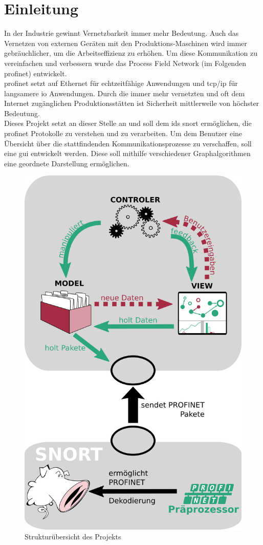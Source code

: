 \chapter*{Einleitung}

In der Industrie gewinnt Vernetzbarkeit immer mehr Bedeutung. Auch das Vernetzen von externen Geräten mit den Produktions-Maschinen wird immer gebräuchlicher, um die Arbeitseffizienz zu erhöhen. Um diese Kommunikation zu vereinfachen und verbessern wurde das Process Field Network (im Folgenden \gls{profinet}) entwickelt.\\
\gls{profinet} setzt auf Ethernet für echtzeitfähige Anwendungen und \gls{tcp}/\gls{ip} für langsamere \gls{io} Anwendungen. Durch die immer mehr vernetzten und oft dem Internet zugänglichen Produktionsstätten ist Sicherheit mittlerweile von höchster Bedeutung. \\
Dieses Projekt setzt an dieser Stelle an und soll dem \gls{ids} \gls{snort} ermöglichen, die \gls{profinet} Protokolle zu verstehen und zu verarbeiten. Um dem Benutzer eine Übersicht über die stattfindenden Kommunikationsprozesse zu verschaffen, soll eine \gls{gui} entwickelt werden. Diese soll mithilfe verschiedener Graphalgorithmen eine geordnete Darstellung ermöglichen.

\begin{figure}
  \centering
  \includegraphics[width=\textwidth]{../diagrams/intro_diagram/intro_diagram.png}
  \caption{Strukturübersicht des Projekts}\label{ASDF}
\end{figure}